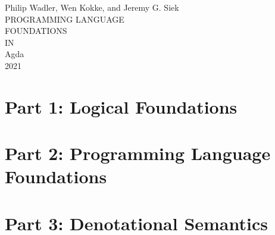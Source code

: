 \documentclass[10pt]{book}
\begin{document}
\setlength{\mathindent}{0pt}
\setlength{\parindent}{0em}
\setlength{\parskip}{1em}

\providecommand{\tightlist}{%
  \setlength{\itemsep}{0pt}\setlength{\parskip}{0pt}}

\begin{titlepage}
  \newlength{\drop}%
  \setlength{\drop}{0.12\textheight}%
  \centering%
  \vspace*{\drop}
  \begingroup%
  {\large Philip Wadler, Wen Kokke, and Jeremy G. Siek}\\[\baselineskip]
  {\Huge PROGRAMMING LANGUAGE}\\[\baselineskip]
  {\Huge FOUNDATIONS}\\[\baselineskip]
  {\Large IN}\\[\baselineskip]
  {\Huge Agda}\\[\drop]
  \vfill%
  {\small\scshape 2021}\par%
  \null\endgroup
\end{titlepage}

\frontmatter
\setcounter{tocdepth}{0}

\tableofcontents
\setcounter{tocdepth}{1}





\mainmatter%

\part{Part 1: Logical Foundations}











\part{Part 2: Programming Language Foundations}










\part{Part 3: Denotational Semantics}






\cleardoublepage%
%

\appendix
{}



\end{document}
